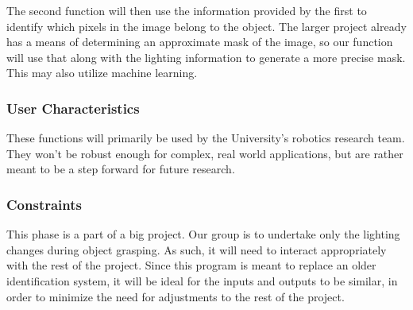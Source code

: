 \documentclass[10pt,journal,compsoc, draftclsnofoot,onecolumn]{IEEEtran}
\begin{document}
The second function will then use the information provided by the first to identify which pixels in the image belong to the object. The larger project already has a means of determining an approximate mask of the image, so our function will use that along with the lighting information to generate a more precise mask. This may also utilize machine learning.

\subsubsection{User Characteristics}
These functions will primarily be used by the University's robotics research team. They won't be robust enough for complex, real world applications, but are rather meant to be a step forward for future research.


\subsubsection{Constraints}
This phase is a part of a big project. Our group is to undertake only the lighting changes during object grasping. As such, it will need to interact appropriately with the rest of the project. Since this program is meant to replace an older identification system, it will be ideal for the inputs and outputs to be similar, in order to minimize the need for adjustments to the rest of the project.
\end{document}

